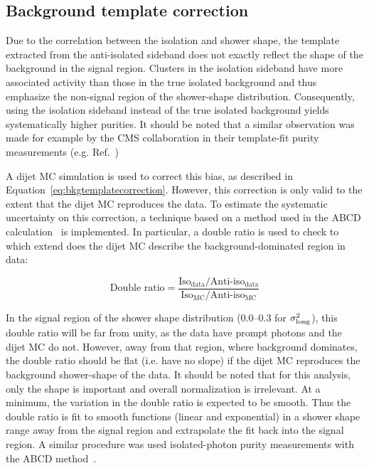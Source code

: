 \subsection{Background template correction}
\label{sec:bkgtemplatecorrection}
Due to the correlation between the isolation and shower shape, the template extracted from the anti-isolated sideband does not exactly reflect the shape of the background in the signal region. Clusters in the isolation sideband have more associated activity than those in the true isolated background and thus emphasize the non-signal region of the shower-shape distribution. Consequently, using the isolation sideband instead of the true isolated background yields systematically higher purities. It should be noted that a similar observation was made for example by the CMS collaboration in their template-fit purity measurements (e.g. Ref.~\cite{Sirunyan:2017qhf})

A dijet MC simulation is used to correct this bias, as described in Equation~\ref{eq:bkgtemplatecorrection}. However, this correction is only valid to the extent that the dijet MC reproduces the data. To estimate the systematic uncertainty on this correction, a technique based on a method used in the ABCD calculation~\cite{Erwann} is implemented. In particular, a double ratio is used to check to which extend does the dijet MC describe the background-dominated region in data: 

\begin{equation}
    \text{Double ratio} = \frac{\text{Iso}_{\text{data}}/\text{Anti-iso}_{\text{data}}}{\text{Iso}_{\text{MC}}/\text{Anti-iso}_{\text{MC}}}
    \label{eq:bkgtemplatedoubleratio}
\end{equation}

In the signal region of the shower shape distribution (0.0--0.3 for $\sigma^{2}_{\mathrm{long}}$), this double ratio will be far from unity, as the data have prompt photons and the dijet MC do not. However, away from that region, where background dominates, the double ratio should be flat (i.e. have no slope) if the dijet MC reproduces the background shower-shape of the data. It should be noted that for this analysis, only the shape is important and overall normalization is irrelevant. At a minimum, the variation in the double ratio is expected to be smooth. Thus the double ratio is fit to smooth functions (linear and exponential) in a shower shape range away from the signal region and extrapolate the fit back into the signal region. A similar procedure was used isolated-photon purity measurements with the ABCD method~\cite{Acharya:2019jkx}.

